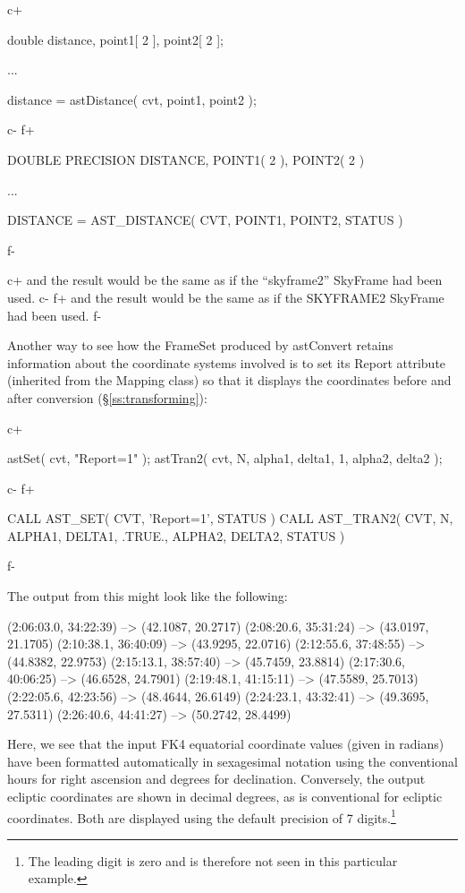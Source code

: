 \documentclass[twoside,11pt]{starlink}
\providecommand{\secref}[1]{\S\ref{#1}}
\begin{document}
c+
\small
\begin{terminalv}
double distance, point1[ 2 ], point2[ 2 ];

...

distance = astDistance( cvt, point1, point2 );
\end{terminalv}
\normalsize
c-
f+
\small
\begin{terminalv}
      DOUBLE PRECISION DISTANCE, POINT1( 2 ), POINT2( 2 )

      ...

      DISTANCE = AST_DISTANCE( CVT, POINT1, POINT2, STATUS )
\end{terminalv}
\normalsize
f-

c+
and the result would be the same as if the ``skyframe2'' SkyFrame had
been used.
c-
f+
and the result would be the same as if the SKYFRAME2 SkyFrame had been
used.
f-

Another way to see how the FrameSet produced by astConvert retains
information about the coordinate systems involved is to set its Report
attribute (inherited from the Mapping class) so that it displays the
coordinates before and after conversion (\secref{ss:transforming}):

c+
\small
\begin{terminalv}
astSet( cvt, "Report=1" );
astTran2( cvt, N, alpha1, delta1, 1, alpha2, delta2 );
\end{terminalv}
\normalsize
c-
f+
\small
\begin{terminalv}
      CALL AST_SET( CVT, 'Report=1', STATUS )
      CALL AST_TRAN2( CVT, N, ALPHA1, DELTA1, .TRUE., ALPHA2, DELTA2, STATUS )
\end{terminalv}
\normalsize
f-

The output from this might look like the following:

\begin{terminalv}
(2:06:03.0, 34:22:39) --> (42.1087, 20.2717)
(2:08:20.6, 35:31:24) --> (43.0197, 21.1705)
(2:10:38.1, 36:40:09) --> (43.9295, 22.0716)
(2:12:55.6, 37:48:55) --> (44.8382, 22.9753)
(2:15:13.1, 38:57:40) --> (45.7459, 23.8814)
(2:17:30.6, 40:06:25) --> (46.6528, 24.7901)
(2:19:48.1, 41:15:11) --> (47.5589, 25.7013)
(2:22:05.6, 42:23:56) --> (48.4644, 26.6149)
(2:24:23.1, 43:32:41) --> (49.3695, 27.5311)
(2:26:40.6, 44:41:27) --> (50.2742, 28.4499)
\end{terminalv}

Here, we see that the input FK4 equatorial coordinate values (given in
radians) have been formatted automatically in sexagesimal notation
using the conventional hours for right ascension and degrees for
declination. Conversely, the output ecliptic coordinates are shown in
decimal degrees, as is conventional for ecliptic coordinates. Both are
displayed using the default precision of 7 digits.\footnote{The
leading digit is zero and is therefore not seen in this particular
example.}
\end{document}
